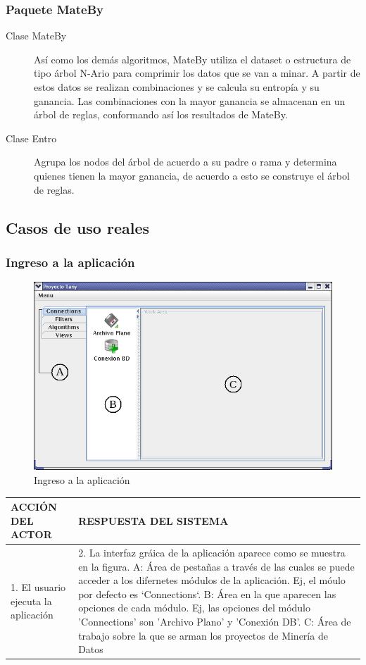 \subsubsection{Paquete MateBy}
\begin{description}
\item [Clase MateBy] As\'i como los dem\'as algoritmos, MateBy utiliza el dataset o estructura de tipo
\'arbol N-Ario para comprimir los datos que se van a minar. A partir de estos datos se realizan
combinaciones y se calcula su entrop\'ia y su ganancia. Las combinaciones con la mayor ganancia se
almacenan en un \'arbol de reglas, conformando as\'i los resultados de MateBy.
\item [Clase Entro] Agrupa los nodos del \'arbol de acuerdo a su padre o rama y determina quienes tienen
la mayor ganancia, de acuerdo a esto se construye el \'arbol de reglas.
\end{description}

\newpage
\subsection{Casos de uso reales}
\subsubsection{Ingreso a la aplicaci\'on}
\begin{figure}[ht]
\centering
\includegraphics[width=1\textwidth]{images/01.png}
\caption{Ingreso a la aplicaci\'on}
\end{figure}
\begin{center}
\begin{tabular}{|p{60mm}|p{60mm}|} \hline
ACCI\'ON DEL ACTOR & RESPUESTA DEL SISTEMA \\ \hline
1. El usuario ejecuta la aplicaci\'on & 2. La interfaz gr\'aica de la aplicaci\'on aparece como se muestra en la figura. A: \'Area de pesta\~nas a trav\'es de las cuales se puede acceder a los difernetes m\'odulos de la aplicaci\'on. Ej, el m\'oulo por defecto es `Connections`. B: \'Area en la que aparecen las opciones de cada m\'odulo. Ej, las opciones del m\'odulo 'Connections' son 'Archivo Plano' y 'Conexi\'on DB'.   C: \'Area de trabajo sobre la que se arman los proyectos de Miner\'ia de Datos\\ \hline
\end{tabular}
\end{center}
\newpage
